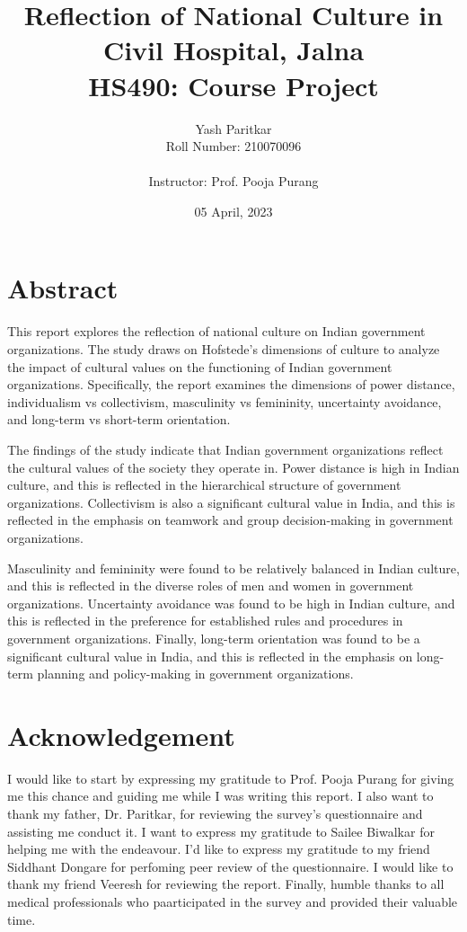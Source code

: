 \documentclass[12pt]{article}
\title{\textbf{Reflection of National Culture in Civil Hospital, Jalna}\\
HS490: Course Project}
\author{Yash Paritkar\\
Roll Number: 210070096\\
\\
Instructor: Prof. Pooja Purang}
\date{05 April, 2023}
\begin{document}
\maketitle

\newpage
\section*{Abstract}
This report explores the reflection of national culture on Indian government organizations. The study draws on Hofstede's dimensions of culture to analyze the impact of cultural values on the functioning of Indian government organizations. Specifically, the report examines the dimensions of power distance, individualism vs collectivism, masculinity vs femininity, uncertainty avoidance, and long-term vs short-term orientation.

The findings of the study indicate that Indian government organizations reflect the cultural values of the society they operate in. Power distance is high in Indian culture, and this is reflected in the hierarchical structure of government organizations. Collectivism is also a significant cultural value in India, and this is reflected in the emphasis on teamwork and group decision-making in government organizations.

Masculinity and femininity were found to be relatively balanced in Indian culture, and this is reflected in the diverse roles of men and women in government organizations. Uncertainty avoidance was found to be high in Indian culture, and this is reflected in the preference for established rules and procedures in government organizations. Finally, long-term orientation was found to be a significant cultural value in India, and this is reflected in the emphasis on long-term planning and policy-making in government organizations.


\newpage
\section*{Acknowledgement}
I would like to start by expressing my gratitude to Prof. Pooja Purang for giving me this chance and guiding me while I was writing this report. I also want to thank my father, Dr. Paritkar, for reviewing the survey's questionnaire and assisting me conduct it. I want to express my gratitude to Sailee Biwalkar for helping me with the endeavour. I'd like to express my gratitude to my friend Siddhant Dongare for perfoming peer review of the questionnaire. I would like to thank my friend Veeresh for reviewing the report. Finally, humble thanks to all medical professionals who paarticipated in the survey and provided their valuable time.
\end{document}
